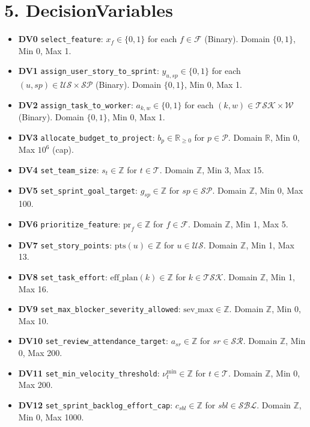 \documentclass[11pt,a4paper]{article}
\begin{document}
\section{5. DecisionVariables}
\begin{itemize}[leftmargin=2em]
  \item \textbf{DV0} \texttt{select\_feature}:\; $x_f\in\{0,1\}$ for each $f\in\mathcal{F}$ (Binary). Domain $\{0,1\}$, Min 0, Max 1.
  \item \textbf{DV1} \texttt{assign\_user\_story\_to\_sprint}:\; $y_{u,sp}\in\{0,1\}$ for each $(u,sp)\in\mathcal{US}\times\mathcal{SP}$ (Binary). Domain $\{0,1\}$, Min 0, Max 1.
  \item \textbf{DV2} \texttt{assign\_task\_to\_worker}:\; $a_{k,w}\in\{0,1\}$ for each $(k,w)\in\mathcal{TSK}\times\mathcal{W}$ (Binary). Domain $\{0,1\}$, Min 0, Max 1.
  \item \textbf{DV3} \texttt{allocate\_budget\_to\_project}:\; $b_p\in\mathbb{R}_{\ge 0}$ for $p\in\mathcal{P}$. Domain $\mathbb{R}$, Min 0, Max $10^6$ (cap).
  \item \textbf{DV4} \texttt{set\_team\_size}:\; $s_t\in\mathbb{Z}$ for $t\in\mathcal{T}$. Domain $\mathbb{Z}$, Min 3, Max 15.
  \item \textbf{DV5} \texttt{set\_sprint\_goal\_target}:\; $g_{sp}\in\mathbb{Z}$ for $sp\in\mathcal{SP}$. Domain $\mathbb{Z}$, Min 0, Max 100.
  \item \textbf{DV6} \texttt{prioritize\_feature}:\; $\mathrm{pr}_f\in\mathbb{Z}$ for $f\in\mathcal{F}$. Domain $\mathbb{Z}$, Min 1, Max 5.
  \item \textbf{DV7} \texttt{set\_story\_points}:\; $\mathrm{pts}(u)\in\mathbb{Z}$ for $u\in\mathcal{US}$. Domain $\mathbb{Z}$, Min 1, Max 13.
  \item \textbf{DV8} \texttt{set\_task\_effort}:\; $\mathrm{eff\_plan}(k)\in\mathbb{Z}$ for $k\in\mathcal{TSK}$. Domain $\mathbb{Z}$, Min 1, Max 16.
  \item \textbf{DV9} \texttt{set\_max\_blocker\_severity\_allowed}:\; $\mathrm{sev\_max}\in\mathbb{Z}$. Domain $\mathbb{Z}$, Min 0, Max 10.
  \item \textbf{DV10} \texttt{set\_review\_attendance\_target}:\; $a_{sr}\in\mathbb{Z}$ for $sr\in\mathcal{SR}$. Domain $\mathbb{Z}$, Min 0, Max 200.
  \item \textbf{DV11} \texttt{set\_min\_velocity\_threshold}:\; $\nu^{\min}_t\in\mathbb{Z}$ for $t\in\mathcal{T}$. Domain $\mathbb{Z}$, Min 0, Max 200.
  \item \textbf{DV12} \texttt{set\_sprint\_backlog\_effort\_cap}:\; $c_{sbl}\in\mathbb{Z}$ for $sbl\in\mathcal{SBL}$. Domain $\mathbb{Z}$, Min 0, Max 1000.
\end{itemize}
\end{document}
